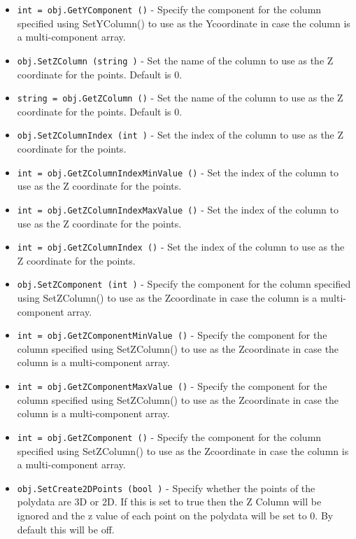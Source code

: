 \begin{itemize}
\item  \verb|int = obj.GetYComponent ()| -  Specify the component for the column specified using SetYColumn() to
 use as the Ycoordinate in case the column is a multi-component array.

\item  \verb|obj.SetZColumn (string )| -  Set the name of the column to use as the Z coordinate for the points.
 Default is 0.

\item  \verb|string = obj.GetZColumn ()| -  Set the name of the column to use as the Z coordinate for the points.
 Default is 0.

\item  \verb|obj.SetZColumnIndex (int )| -  Set the index of the column to use as the Z coordinate for the points. 

\item  \verb|int = obj.GetZColumnIndexMinValue ()| -  Set the index of the column to use as the Z coordinate for the points. 

\item  \verb|int = obj.GetZColumnIndexMaxValue ()| -  Set the index of the column to use as the Z coordinate for the points. 

\item  \verb|int = obj.GetZColumnIndex ()| -  Set the index of the column to use as the Z coordinate for the points. 

\item  \verb|obj.SetZComponent (int )| -  Specify the component for the column specified using SetZColumn() to
 use as the Zcoordinate in case the column is a multi-component array.

\item  \verb|int = obj.GetZComponentMinValue ()| -  Specify the component for the column specified using SetZColumn() to
 use as the Zcoordinate in case the column is a multi-component array.

\item  \verb|int = obj.GetZComponentMaxValue ()| -  Specify the component for the column specified using SetZColumn() to
 use as the Zcoordinate in case the column is a multi-component array.

\item  \verb|int = obj.GetZComponent ()| -  Specify the component for the column specified using SetZColumn() to
 use as the Zcoordinate in case the column is a multi-component array.

\item  \verb|obj.SetCreate2DPoints (bool )| -  Specify whether the points of the polydata are 3D or 2D. If this is set to
 true then the Z Column will be ignored and the z value of each point on the 
 polydata will be set to 0. By default this will be off.


\end{itemize}
